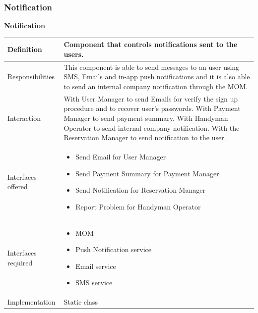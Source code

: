 \documentclass{article}
\begin{document}
			\subsubsection{Notification}
			\begin{minipage}{\linewidth}
			\end{minipage}
			\begin{center}
				\centerline{\textbf{Notification}}	
				\begin{tabular}{| l | p{9cm} |}\hline
					Definition & Component that controls notifications sent to the users.\\\hline
					Responsibilities & This component is able to send messages to an user using SMS, Emails and in-app push notifications and it is also able to send an internal company notification through the MOM. \\\hline
					Interaction & With User Manager to send Emails for verify the sign up procedure and to recover user's passwords. With Payment Manager to send payment summary. With Handyman Operator to send internal company notification. With the Reservation Manager to send notification to the user. \\\hline
					Interfaces offered & \begin{itemize}
						\item Send Email for User Manager
						\item Send Payment Summary for Payment Manager
						\item Send Notification for Reservation Manager
						\item Report Problem for Handyman Operator
					\end{itemize}\\\hline
					Interfaces required & \begin{itemize}
						\item MOM
						\item Push Notification service
						\item Email service
						\item SMS service
					\end{itemize}\\\hline
					Implementation & Static class\\\hline
				\end{tabular}
			\end{center}
			\pagebreak
		
\end{document}
